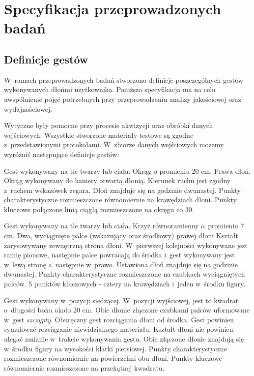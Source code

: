 \chapter{Specyfikacja przeprowadzonych badań}\label{Chapter_SpecyfikacjaPrzeprowadzonychBadan}

  \section{Definicje gestów}\label{Section_DefinicjeGestow}

    W~ramach przeprowadzonych badań stworzono definicje poszczególnych gestów wykonywanych dłońmi użytkownika. Poniższa specyfikacja ma na celu uwspólnienie pojęć potrzebnych przy przeprowadzeniu analizy jakościowej oraz wydajnościowej.

    Wytyczne były pomocne przy procesie akwizycji oraz obróbki danych wejściowych. Wszystkie stworzone materiały testowe są zgodne z~przedstawionymi protokołami. W~zbiorze danych wejściowych możemy wyróżnić następujące definicje gestów:

         {Gest wykonywany na tle twarzy lub ciała.}
         {Okrąg o promieniu 20 cm.}
         {Prawa dłoń.}
         {Okrąg wykonywany do kamery otwartą dłonią.}
         {Kierunek ruchu jest zgodny z~ruchem wskazówek zegara.}
         {Dłoń znajduje się na godzinie dwunastej.}
         {Punkty charakterystyczne rozmieszczone równomiernie na krawędziach dłoni.}
         {Punkty kluczowe połączone linią ciągłą rozmieszczone na okręgu co 30\degree.}

    \newpage
         {Gest wykonywany na tle twarzy lub ciała.}
         {Krzyż równoramienny o~promieniu 7 cm.}
         {Dwa, wyciągnięte palce (wskazujący oraz środkowy) prawej dłoni}
         {Kształt zarysowywany zewnętrzną strona dłoni.}
         {W~pierwszej kolejności wykonywane jest ramię pionowe, następnie palce powracają do środka i~gest wykonywany jest w~lewą stronę a~następnie w~prawo.}
         {Ustawiona dłoń znajduje się na godzinie dwunastej.}
         {Punkty charakterystyczne rozmieszczone na czubkach wyciągniętych palców.}
         {5 punktów kluczowych - cztery na krawędziach i~jeden w~środku figury.}

         {Gest wykonywany w~pozycji siedzącej.}
         {W~pozycji wyjściowej, jest to kwadrat o~długości boku około 20 cm.}
         {Obie dłonie złączone czubkami palców uformowane w~gest \textit{szczypty}.}
         {Oburęczny gest rozciągania dłoni od środka.}
         {Gest powinien symulować rozciąganie niewidzialnego materiału. Kształt dłoni nie powinien ulegać zmianie w~trakcie wykonywania gestu.}
         {Obie złączone dłonie znajdują się w~środku figury na wysokości klatki piersiowej.}
         {Punkty charakterystyczne rozmieszczone równomiernie na powierzchni obu dłoni.}
         {Punkty kluczowe równomiernie rozmieszczone na przekątnej kwadratu.}

